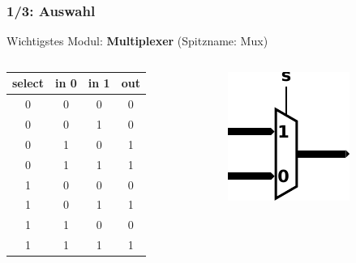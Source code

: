 \documentclass[t,aspectratio=169,usenames,dvipsnames]{beamer}
\begin{document}
\begin{frame}
  \frametitle{1/3: Auswahl}

  Wichtigstes Modul: \textbf{Multiplexer} (Spitzname: Mux)

  \begin{columns}
    \begin{column}{.45\textwidth}
      \begin{center}
        \begin{tabular}{cccc}
          \toprule
          select & in 0 & in 1 & out \\
          \midrule
          0 & 0 & 0 & 0 \\
          0 & 0 & 1 & 0 \\
          0 & 1 & 0 & 1 \\
          0 & 1 & 1 & 1 \\
          1 & 0 & 0 & 0 \\
          1 & 0 & 1 & 1 \\
          1 & 1 & 0 & 0 \\
          1 & 1 & 1 & 1 \\
          \bottomrule
        \end{tabular}
      \end{center}
    \end{column}
    \begin{column}{.45\textwidth}
      \begin{center}
        \includegraphics[width=.66\textwidth]{multiplexer.pdf}
      \end{center}
    \end{column}
  \end{columns}
\end{frame}
\end{document}
